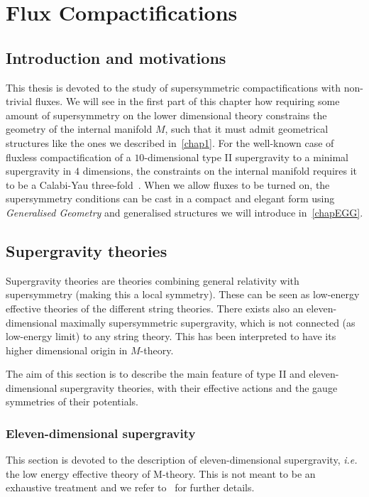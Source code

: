 \documentclass[debug]{phd}
\begin{document}
	\chapter{Flux Compactifications}
	\label{chapSugra}
		\section{Introduction and motivations}
						
			This thesis is devoted to the study of supersymmetric compactifications with non-trivial fluxes.
			We will see in the first part of this chapter how requiring some amount of supersymmetry on the lower dimensional theory constrains the geometry of the internal manifold $M$, such that it must admit geometrical structures like the ones we described in~\cref{chap1}.
			For the well-known case of fluxless compactification of a $10$-dimensional type II supergravity to a minimal supergravity in $4$ dimensions, the constraints on the internal manifold requires it to be a Calabi-Yau three-fold~\cite{CYcomp}.
			When we allow fluxes to be turned on, the supersymmetry conditions can be cast in a compact and elegant form using \emph{Generalised Geometry} and generalised structures we will introduce in~\cref{chapEGG}.
		\section{Supergravity theories}
			Supergravity theories are theories combining general relativity with supersymmetry (making this a local symmetry).
			These can be seen as low-energy effective theories of the different string theories.
			There exists also an eleven-dimensional maximally supersymmetric supergravity, which is not connected (as low-energy limit) to any string theory.
			This has been interpreted to have its higher dimensional origin in $M$-theory.
			
			The aim of this section is to describe the main feature of type II and eleven-dimensional supergravity theories, with their effective actions and the gauge symmetries of their potentials.
			\subsection{Eleven-dimensional supergravity}
				This section is devoted to the description of eleven-dimensional supergravity, \emph{i.e.} the low energy effective theory of M-theory. 
				This is not meant to be an exhaustive treatment and we refer to~\cite{polchinski, BeckerBeckerSchw} for further details.
\end{document}
